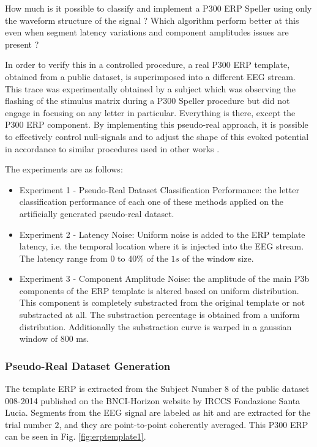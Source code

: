 \documentclass[brainsci,article,submit,moreauthors,pdftex,10pt,a4paper]{mdpi}
\begin{document}
How much is it possible to classify and implement a P300 ERP Speller using only the waveform structure of the signal ? Which algorithm perform better at this even when segment latency variations and component amplitudes issues are present ?

In order to verify this in a controlled procedure, a real P300 ERP template, obtained from a public dataset, is superimposed into a different EEG stream.  This trace was experimentally obtained by a subject which was observing the flashing of the stimulus matrix during a P300 Speller procedure but did not engage in focusing on any letter in particular. Everything is there, except the P300 ERP component. By implementing this pseudo-real approach, it is possible to effectively control null-signals and to adjust the shape of this evoked potential in accordance to similar procedures used in other works \citep{Ouyang2017,Jaskowski2000,QuianQuiroga2003}.

The experiments are as follows:

\begin{itemize}
\item Experiment 1 - Pseudo-Real Dataset Classification Performance: the letter classification performance of each one of these methods applied on the artificially generated pseudo-real dataset.
\item Experiment 2 - Latency Noise: Uniform noise is added to the ERP template latency, i.e. the temporal location where it is injected into the EEG stream.  The latency range from $0$ to $40\%$ of the $1s$ of the window size. 
\item Experiment 3 - Component Amplitude Noise: the amplitude of the main P3b components of the ERP template is altered based on uniform distribution.  This component is completely substracted from the original template or not substracted at all.  The substraction percentage is obtained from a uniform distribution.  Additionally the substraction curve is warped in a gaussian window of 800 ms.
\end{itemize}


\subsubsection{Pseudo-Real Dataset Generation}

The template ERP is extracted from the Subject Number $8$ of the public dataset 008-2014  \citep{Riccio2013} published on the BNCI-Horizon website \citep{Brunner2014} by IRCCS Fondazione Santa Lucia. Segments from the EEG signal are labeled as hit and are extracted for the trial number $2$, and they are point-to-point coherently averaged.  This P300 ERP can be seen in Fig.  \ref{fig:erptemplate1}. 
\end{document}
